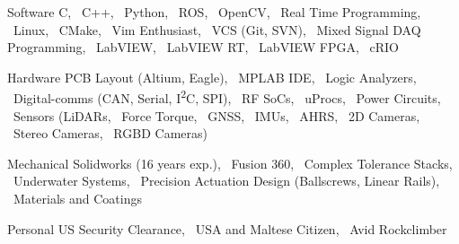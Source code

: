 
\begin{cvskills}

  \cvskill%
      {Software}
      {
            C,  
            \ C++,  
            \ Python,  
            \ ROS,  
            \ OpenCV,  
            \ Real Time Programming,  
            \ Linux,  
            \ CMake,  
            \ Vim Enthusiast,
            \ VCS (Git, SVN),  
            \ Mixed Signal DAQ Programming,  
            \ LabVIEW,  
            \ LabVIEW RT,  
            \ LabVIEW FPGA,  
            \ cRIO
        }

  \cvskill%
      {Hardware} 
      {
            PCB Layout (Altium, Eagle), 
            \ MPLAB IDE,  
            \ Logic Analyzers,  
            \ Digital-comms (CAN, Serial, I\textsuperscript{2}C, SPI), 
            \ RF SoCs, 
            \ uProcs, 
            \ Power Circuits, 
            \ Sensors (LiDARs, 
            \ Force Torque,  
            \ GNSS, 
            \ IMUs, 
            \ AHRS, 
            \ 2D Cameras, 
            \ Stereo Cameras,  
            \ RGBD Cameras) 
      }

  \cvskill%
      {Mechanical}
      {
            Solidworks (16 years exp.),
            \ Fusion 360,
            \ Complex Tolerance Stacks,
            \ Underwater Systems,
            \ Precision Actuation Design (Ballscrews, Linear Rails), 
            \ Materials and Coatings
      }

  \cvskill%
      {Personal}
      {
            US Security Clearance, 
            \ USA and Maltese Citizen, 
            \ Avid Rockclimber
      }

\end{cvskills}
